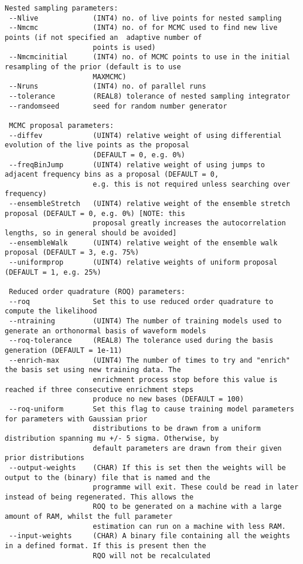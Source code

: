 \begin{lstlisting}[frame=single]
 Nested sampling parameters:
 --Nlive             (INT4) no. of live points for nested sampling
 --Nmcmc             (INT4) no. of for MCMC used to find new live points (if not specified an  adaptive number of
                     points is used)
 --Nmcmcinitial      (INT4) no. of MCMC points to use in the initial resampling of the prior (default is to use
                     MAXMCMC)
 --Nruns             (INT4) no. of parallel runs
 --tolerance         (REAL8) tolerance of nested sampling integrator
 --randomseed        seed for random number generator

 MCMC proposal parameters:
 --diffev            (UINT4) relative weight of using differential evolution of the live points as the proposal
                     (DEFAULT = 0, e.g. 0%)
 --freqBinJump       (UINT4) relative weight of using jumps to adjacent frequency bins as a proposal (DEFAULT = 0,
                     e.g. this is not required unless searching over frequency)
 --ensembleStretch   (UINT4) relative weight of the ensemble stretch proposal (DEFAULT = 0, e.g. 0%) [NOTE: this
                     proposal greatly increases the autocorrelation lengths, so in general should be avoided]
 --ensembleWalk      (UINT4) relative weight of the ensemble walk proposal (DEFAULT = 3, e.g. 75%)
 --uniformprop       (UINT4) relative weights of uniform proposal (DEFAULT = 1, e.g. 25%)

 Reduced order quadrature (ROQ) parameters:
 --roq               Set this to use reduced order quadrature to compute the likelihood
 --ntraining         (UINT4) The number of training models used to generate an orthonormal basis of waveform models
 --roq-tolerance     (REAL8) The tolerance used during the basis generation (DEFAULT = 1e-11)
 --enrich-max        (UINT4) The number of times to try and "enrich" the basis set using new training data. The
                     enrichment process stop before this value is reached if three consecutive enrichment steps
                     produce no new bases (DEFAULT = 100)
 --roq-uniform       Set this flag to cause training model parameters for parameters with Gaussian prior
                     distributions to be drawn from a uniform distribution spanning mu +/- 5 sigma. Otherwise, by
                     default parameters are drawn from their given prior distributions
 --output-weights    (CHAR) If this is set then the weights will be output to the (binary) file that is named and the
                     programme will exit. These could be read in later instead of being regenerated. This allows the
                     ROQ to be generated on a machine with a large amount of RAM, whilst the full parameter
                     estimation can run on a machine with less RAM.
 --input-weights     (CHAR) A binary file containing all the weights in a defined format. If this is present then the
                     RQO will not be recalculated


\end{lstlisting}
